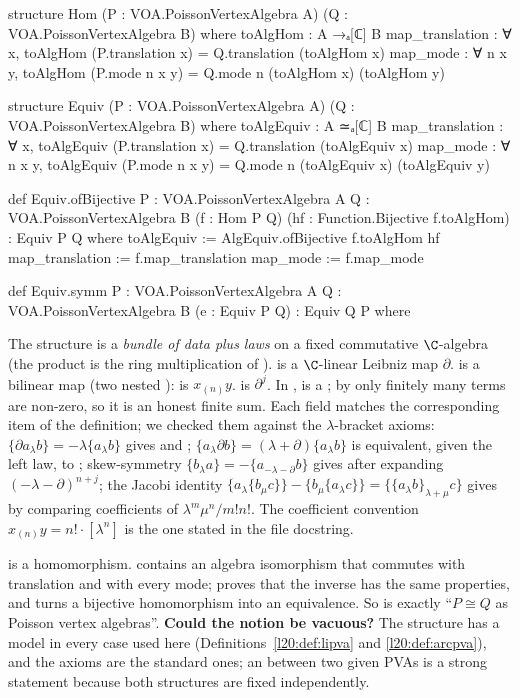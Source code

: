 \begin{leancode}
structure Hom (P : VOA.PoissonVertexAlgebra A) (Q : VOA.PoissonVertexAlgebra B) where
  toAlgHom : A →ₐ[ℂ] B
  map_translation : ∀ x, toAlgHom (P.translation x) = Q.translation (toAlgHom x)
  map_mode : ∀ n x y, toAlgHom (P.mode n x y) = Q.mode n (toAlgHom x) (toAlgHom y)

structure Equiv (P : VOA.PoissonVertexAlgebra A) (Q : VOA.PoissonVertexAlgebra B) where
  toAlgEquiv : A ≃ₐ[ℂ] B
  map_translation : ∀ x, toAlgEquiv (P.translation x) = Q.translation (toAlgEquiv x)
  map_mode : ∀ n x y, toAlgEquiv (P.mode n x y) = Q.mode n (toAlgEquiv x) (toAlgEquiv y)

def Equiv.ofBijective {P : VOA.PoissonVertexAlgebra A} {Q : VOA.PoissonVertexAlgebra B}
    (f : Hom P Q) (hf : Function.Bijective f.toAlgHom) : Equiv P Q where
  toAlgEquiv := AlgEquiv.ofBijective f.toAlgHom hf
  map_translation := f.map_translation
  map_mode := f.map_mode

def Equiv.symm {P : VOA.PoissonVertexAlgebra A} {Q : VOA.PoissonVertexAlgebra B}
    (e : Equiv P Q) : Equiv Q P where
\end{leancode}

\begin{dictionary}
The structure is a \emph{bundle of data plus laws} on a fixed commutative $\C$-algebra  (the
product is the ring multiplication of ).  is a $\C$-linear Leibniz map
$\partial$.  is a bilinear map (two nested ):  is $x_{(n)}y$.
 is $\partial^j$. In ,  is a ; by
 only finitely many terms are non-zero, so it is an honest finite sum. Each field matches the
corresponding item of the definition; we checked them against the $\lambda$-bracket axioms:
$\{\partial a_\lambda b\}=-\lambda\{a_\lambda b\}$ gives  and
; $\{a_\lambda\partial b\}=(\lambda+\partial)\{a_\lambda b\}$ is equivalent, given
the left law, to ; skew-symmetry $\{b_\lambda a\}=-\{a_{-\lambda-\partial}b\}$ gives
 after expanding $(-\lambda-\partial)^{n+j}$; the Jacobi identity
$\{a_\lambda\{b_\mu c\}\}-\{b_\mu\{a_\lambda c\}\}=\{\{a_\lambda b\}_{\lambda+\mu}c\}$ gives  by
comparing coefficients of $\lambda^m\mu^n/m!n!$. The coefficient convention $x_{(n)}y=n!\cdot[\lambda^n]$ is
the one stated in the file docstring.

 is a homomorphism.  contains an algebra isomorphism  that commutes with
translation and with every mode;  proves that the inverse has the same properties, and
 turns a bijective homomorphism into an equivalence. So
 is exactly ``$P\cong Q$ as Poisson vertex algebras''.
\textbf{Could the notion be vacuous?} The structure has a model in every case used here
(Definitions~\ref{l20:def:lipva} and \ref{l20:def:arcpva}), and the axioms are the standard ones; an
 between two given PVAs is a strong statement because both structures are fixed independently.
\end{dictionary}

